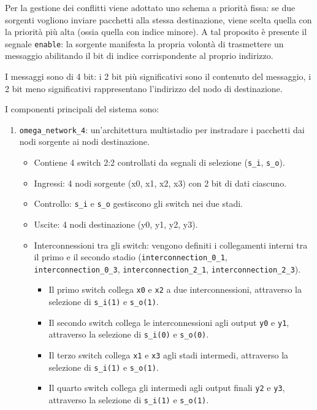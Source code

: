 Per la gestione dei conflitti viene adottato uno schema a priorità fissa: se due sorgenti vogliono inviare pacchetti alla stessa destinazione, viene scelta quella con la priorità più alta (ossia quella con indice minore). A tal proposito è presente il segnale \texttt{enable}: la sorgente manifesta la propria volontà di trasmettere un messaggio abilitando il bit di indice corrispondente al proprio indirizzo.

I messaggi sono di 4 bit: i 2 bit più significativi sono il contenuto del messaggio, i 2 bit meno significativi rappresentano l'indirizzo del nodo di destinazione.

I componenti principali del sistema sono:

\begin{enumerate}
    \item \texttt{omega\_network\_4}: un'architettura multistadio per instradare i pacchetti dai nodi sorgente ai nodi destinazione.
    \begin{itemize}
        \item Contiene 4 switch 2:2 controllati da segnali di selezione (\texttt{s\_i}, \texttt{s\_o}).
        \item Ingressi: 4 nodi sorgente (x0, x1, x2, x3) con 2 bit di dati ciascuno.
        \item Controllo: \texttt{s\_i} e \texttt{s\_o} gestiscono gli switch nei due stadi.
        \item Uscite: 4 nodi destinazione (y0, y1, y2, y3).
        \item Interconnessioni tra gli switch: vengono definiti i collegamenti interni tra il primo e il secondo stadio (\texttt{interconnection\_0\_1}, \texttt{interconnection\_0\_3}, \texttt{interconnection\_2\_1}, \texttt{interconnection\_2\_3}).
        \begin{itemize}
            \item Il primo switch collega \texttt{x0} e \texttt{x2} a due interconnessioni, attraverso la selezione di \texttt{s\_i(1)} e \texttt{s\_o(1)}.
            \item Il secondo switch collega le interconnessioni agli output \texttt{y0} e \texttt{y1}, attraverso la selezione di \texttt{s\_i(0)} e \texttt{s\_o(0)}.
            \item Il terzo switch collega \texttt{x1} e \texttt{x3} agli stadi intermedi, attraverso la selezione di \texttt{s\_i(1)} e \texttt{s\_o(1)}.
            \item Il quarto switch collega gli intermedi agli output finali \texttt{y2} e \texttt{y3}, attraverso la selezione di \texttt{s\_i(1)} e \texttt{s\_o(1)}.

\end{itemize}
\end{itemize}
\end{enumerate}
